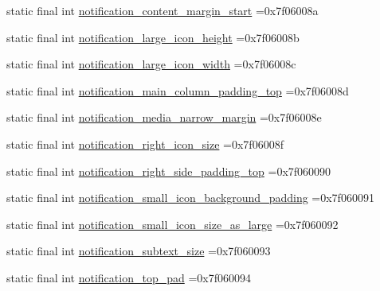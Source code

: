 \begin{DoxyCompactItemize}
\item 
static final int \mbox{\hyperlink{classbr_1_1unb_1_1cic_1_1mp_1_1marketmaster_1_1test_1_1R_1_1dimen_ac9d757f72889a35938e6e1c3ac65fe95}{notification\+\_\+content\+\_\+margin\+\_\+start}} =0x7f06008a
\item 
static final int \mbox{\hyperlink{classbr_1_1unb_1_1cic_1_1mp_1_1marketmaster_1_1test_1_1R_1_1dimen_a255f954b5b5e9ed865b4c66e92023515}{notification\+\_\+large\+\_\+icon\+\_\+height}} =0x7f06008b
\item 
static final int \mbox{\hyperlink{classbr_1_1unb_1_1cic_1_1mp_1_1marketmaster_1_1test_1_1R_1_1dimen_a8826bf8447f2da4bcdbef43d017799ae}{notification\+\_\+large\+\_\+icon\+\_\+width}} =0x7f06008c
\item 
static final int \mbox{\hyperlink{classbr_1_1unb_1_1cic_1_1mp_1_1marketmaster_1_1test_1_1R_1_1dimen_a50daa86befb6528311a505d60b68eef7}{notification\+\_\+main\+\_\+column\+\_\+padding\+\_\+top}} =0x7f06008d
\item 
static final int \mbox{\hyperlink{classbr_1_1unb_1_1cic_1_1mp_1_1marketmaster_1_1test_1_1R_1_1dimen_af31cf227f025cc1a18ad24c9b676db94}{notification\+\_\+media\+\_\+narrow\+\_\+margin}} =0x7f06008e
\item 
static final int \mbox{\hyperlink{classbr_1_1unb_1_1cic_1_1mp_1_1marketmaster_1_1test_1_1R_1_1dimen_a7b49eb831ab9dc41090858adf892b6bb}{notification\+\_\+right\+\_\+icon\+\_\+size}} =0x7f06008f
\item 
static final int \mbox{\hyperlink{classbr_1_1unb_1_1cic_1_1mp_1_1marketmaster_1_1test_1_1R_1_1dimen_a54145a988cf8d58c54d06fb99495a18a}{notification\+\_\+right\+\_\+side\+\_\+padding\+\_\+top}} =0x7f060090
\item 
static final int \mbox{\hyperlink{classbr_1_1unb_1_1cic_1_1mp_1_1marketmaster_1_1test_1_1R_1_1dimen_a7478eff0e314d239bd4b02ced381fb10}{notification\+\_\+small\+\_\+icon\+\_\+background\+\_\+padding}} =0x7f060091
\item 
static final int \mbox{\hyperlink{classbr_1_1unb_1_1cic_1_1mp_1_1marketmaster_1_1test_1_1R_1_1dimen_a495668a89ede46b2282cb9e1211337a0}{notification\+\_\+small\+\_\+icon\+\_\+size\+\_\+as\+\_\+large}} =0x7f060092
\item 
static final int \mbox{\hyperlink{classbr_1_1unb_1_1cic_1_1mp_1_1marketmaster_1_1test_1_1R_1_1dimen_a1170f38a3c241b04d1d02cdbb7a3dd14}{notification\+\_\+subtext\+\_\+size}} =0x7f060093
\item 
static final int \mbox{\hyperlink{classbr_1_1unb_1_1cic_1_1mp_1_1marketmaster_1_1test_1_1R_1_1dimen_ae0314733334834d5dba1f12a29ee4044}{notification\+\_\+top\+\_\+pad}} =0x7f060094

\end{DoxyCompactItemize}

